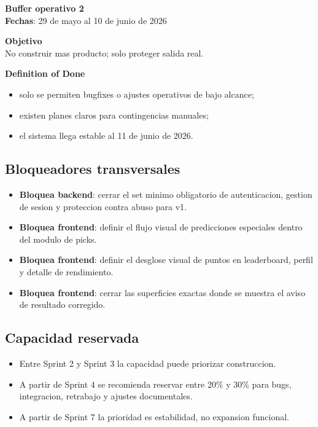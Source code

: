 \begin{docnote}
\textbf{Buffer operativo 2}\\
\textbf{Fechas}: 29 de mayo al 10 de junio de 2026

\textbf{Objetivo}\\
No construir mas producto; solo proteger salida real.

\textbf{Definition of Done}\\
\begin{itemize}
  \item solo se permiten bugfixes o ajustes operativos de bajo alcance;
  \item existen planes claros para contingencias manuales;
  \item el sistema llega estable al 11 de junio de 2026.
\end{itemize}
\end{docnote}

\subsection{Bloqueadores transversales}

\begin{itemize}
  \item \textbf{Bloquea backend}: cerrar el set minimo obligatorio de autenticacion, gestion de sesion y proteccion contra abuso para v1.
  \item \textbf{Bloquea frontend}: definir el flujo visual de predicciones especiales dentro del modulo de picks.
  \item \textbf{Bloquea frontend}: definir el desglose visual de puntos en leaderboard, perfil y detalle de rendimiento.
  \item \textbf{Bloquea frontend}: cerrar las superficies exactas donde se muestra el aviso de resultado corregido.
\end{itemize}

\subsection{Capacidad reservada}

\begin{itemize}
  \item Entre Sprint 2 y Sprint 3 la capacidad puede priorizar construccion.
  \item A partir de Sprint 4 se recomienda reservar entre 20\% y 30\% para bugs, integracion, retrabajo y ajustes documentales.
  \item A partir de Sprint 7 la prioridad es estabilidad, no expansion funcional.
\end{itemize}

